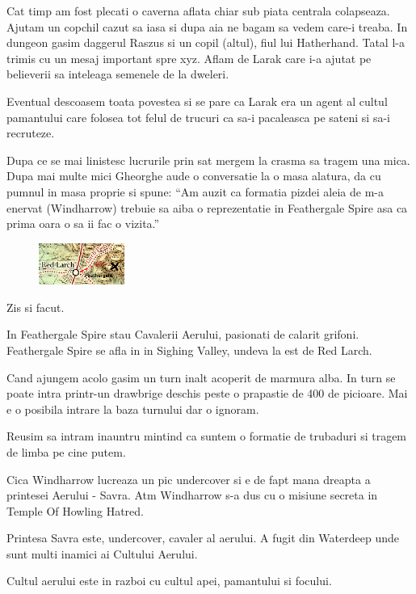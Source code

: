 \documentclass[12pt,oneside]{book}
\begin{document}
Cat timp am fost plecati o caverna aflata chiar sub piata centrala colapseaza. Ajutam un copchil cazut sa iasa si dupa aia ne bagam sa vedem care-i treaba. In dungeon gasim daggerul Raszus si un copil (altul), fiul lui Hatherhand. Tatal l-a trimis cu un mesaj important spre xyz. Aflam de Larak care i-a ajutat pe believerii sa inteleaga semenele de la dweleri.

Eventual descoasem toata povestea si se pare ca Larak era un agent al cultul pamantului care folosea tot felul de trucuri ca sa-i pacaleasca pe sateni si sa-i recruteze.

Dupa ce se mai linistesc lucrurile prin sat mergem la crasma sa tragem una mica.
Dupa mai multe mici Gheorghe aude o conversatie la o masa alatura, da cu pumnul in masa 
proprie si spune:
``Am auzit ca formatia pizdei aleia de m-a enervat (Windharrow) trebuie sa aiba o 
reprezentatie in Feathergale Spire  asa ca prima oara o sa ii fac o vizita.''

\begin{figure}
    \centering
    \includegraphics[width=0.25\textwidth]{images/maps/path-to-feathergale-spire}
\end{figure}

Zis si facut.

In Feathergale Spire stau Cavalerii Aerului, pasionati de calarit grifoni. Feathergale Spire se afla in in Sighing Valley, undeva la est de Red Larch.

Cand ajungem acolo gasim un turn inalt acoperit de marmura alba. In turn se poate intra
printr-un drawbrige deschis peste o prapastie de 400 de picioare. Mai e o posibila intrare 
la baza turnului dar o ignoram.

Reusim sa intram inauntru mintind ca suntem o formatie de trubaduri si tragem de
limba pe cine putem.

Cica Windharrow lucreaza un pic undercover si e de fapt mana dreapta
a printesei Aerului - Savra. Atm Windharrow s-a dus cu o misiune secreta 
in Temple Of Howling Hatred.

Printesa Savra este, undercover, cavaler al aerului. A fugit din Waterdeep unde sunt multi inamici ai Cultului Aerului.

Cultul aerului este in razboi cu cultul apei, pamantului si focului.
\end{document}
